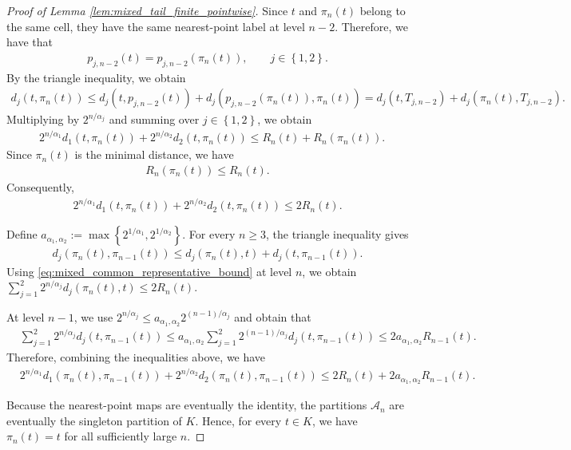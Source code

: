 \documentclass[10pt,a4paper]{amsart}
\newcommand{\cbr}[1]{\left\{#1\right\}}
\begin{document}
\begin{proof}[Proof of Lemma
\ref{lem:mixed_tail_finite_pointwise}]
Since $t$ and $\pi_n(t)$ belong to the same cell, they have the same
nearest-point label at level $n-2$. Therefore, we have that
\begin{align*}
p_{j,n-2}(t)
=
p_{j,n-2}(\pi_n(t)),
\qquad j\in\cbr{1,2}.
\end{align*}
By the triangle inequality, we obtain
\begin{align*}
d_j(t,\pi_n(t))\le
d_j(t,p_{j,n-2}(t))
+
d_j(p_{j,n-2}(\pi_n(t)),\pi_n(t))=
d_j(t,T_{j,n-2})
+
d_j(\pi_n(t),T_{j,n-2}).
\end{align*}
Multiplying by $2^{n/\alpha_j}$ and summing over
$j\in\cbr{1,2}$, we obtain
\begin{align*}
&2^{n/\alpha_1}d_1(t,\pi_n(t))
+
2^{n/\alpha_2}d_2(t,\pi_n(t))\le
R_n(t)+R_n(\pi_n(t)).
\end{align*}
Since $\pi_n(t)$ is the minimal distance, we have
\begin{align*}
R_n(\pi_n(t))
\le
R_n(t).
\end{align*}
Consequently,
\begin{align}
2^{n/\alpha_1}d_1(t,\pi_n(t))
+
2^{n/\alpha_2}d_2(t,\pi_n(t))
\le
2R_n(t).
\label{eq:mixed_common_representative_bound}
\end{align}

Define $a_{\alpha_1,\alpha_2}
:=
\max\cbr{2^{1/\alpha_1},2^{1/\alpha_2}}$.
For every $n\ge3$, the triangle inequality gives
\begin{align*}
d_j(\pi_n(t),\pi_{n-1}(t))
\le
d_j(\pi_n(t),t)
+
d_j(t,\pi_{n-1}(t)).
\end{align*}
Using \eqref{eq:mixed_common_representative_bound} at level $n$, we
obtain $\sum_{j=1}^2
2^{n/\alpha_j}d_j(\pi_n(t),t)
\le
2R_n(t)$.

At level $n-1$, we use $2^{n/\alpha_j}
\le
a_{\alpha_1,\alpha_2}
2^{(n-1)/\alpha_j}$
and obtain that
\begin{align*}
&\sum_{j=1}^2
2^{n/\alpha_j}d_j(t,\pi_{n-1}(t))\le
a_{\alpha_1,\alpha_2}
\sum_{j=1}^2
2^{(n-1)/\alpha_j}d_j(t,\pi_{n-1}(t))\le
2a_{\alpha_1,\alpha_2}R_{n-1}(t).
\end{align*}
Therefore, combining the inequalities above, we have
\begin{align}
&2^{n/\alpha_1}
d_1(\pi_n(t),\pi_{n-1}(t))
+
2^{n/\alpha_2}
d_2(\pi_n(t),\pi_{n-1}(t))\le
2R_n(t)
+
2a_{\alpha_1,\alpha_2}R_{n-1}(t).
\label{eq:mixed_common_parent_edge_bound}
\end{align}

Because the nearest-point maps are eventually the identity, the
partitions $\mathcal A_n$ are eventually the singleton partition of
$K$. Hence, for every $t\in K$, we have $\pi_n(t)=t$ for all sufficiently large $n$.


\end{proof}
\end{document}
